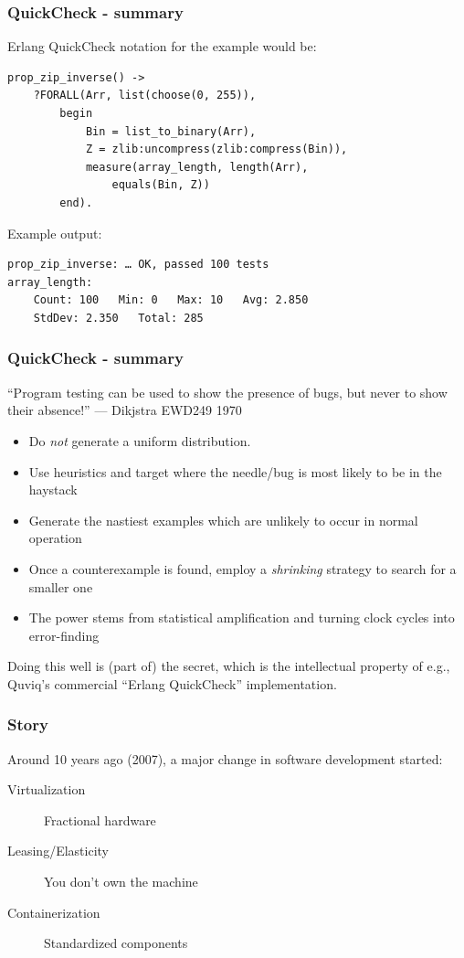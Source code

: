 \documentclass[lualatex]{beamer}
\begin{document}
\begin{frame}[fragile]
\frametitle{QuickCheck - summary}
Erlang QuickCheck notation for the example would be:
\begin{verbatim}
prop_zip_inverse() ->
    ?FORALL(Arr, list(choose(0, 255)),
        begin
            Bin = list_to_binary(Arr),
            Z = zlib:uncompress(zlib:compress(Bin)),
            measure(array_length, length(Arr),
                equals(Bin, Z))
        end).
\end{verbatim}
Example output:
\begin{verbatim}
prop_zip_inverse: … OK, passed 100 tests
array_length:
    Count: 100   Min: 0   Max: 10   Avg: 2.850
    StdDev: 2.350   Total: 285
\end{verbatim}
\end{frame}

\begin{frame}[fragile]
\frametitle{QuickCheck - summary}
``Program testing can be used to show the presence of bugs, but never to show their absence!'' — Dikjstra EWD249 1970

\begin{itemize}
\item Do \emph{not} generate a uniform distribution.
\item Use heuristics and target where the needle/bug is most likely to be in the haystack
\item Generate the nastiest examples which are unlikely to occur in normal operation
\item Once a counterexample is found, employ a \emph{shrinking} strategy to search for a smaller one
\item The power stems from statistical amplification and turning clock cycles into error-finding
\end{itemize}

Doing this well is (part of) the secret, which is the intellectual property of e.g., Quviq's commercial ``Erlang QuickCheck'' implementation.
\end{frame}

\begin{frame}[fragile]
  \frametitle{Story}
  Around 10 years ago (2007), a major change in software development started:
  \begin{description}
  \item[Virtualization] Fractional hardware
  \item[Leasing/Elasticity] You don't own the machine
  \item[Containerization] Standardized components
  \end{description}
\end{frame}
\end{document}
